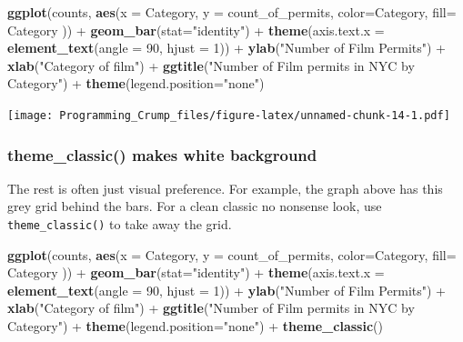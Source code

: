 \documentclass[]{book}
\newenvironment{Shaded}{\begin{snugshade}}{\end{snugshade}}
\newcommand{\KeywordTok}[1]{\textcolor[rgb]{0.13,0.29,0.53}{\textbf{{#1}}}}
\newcommand{\DataTypeTok}[1]{\textcolor[rgb]{0.13,0.29,0.53}{{#1}}}
\newcommand{\DecValTok}[1]{\textcolor[rgb]{0.00,0.00,0.81}{{#1}}}
\newcommand{\StringTok}[1]{\textcolor[rgb]{0.31,0.60,0.02}{{#1}}}
\newcommand{\NormalTok}[1]{{#1}}
\theoremstyle{definition}
\theoremstyle{definition}
\theoremstyle{definition}
\theoremstyle{remark}
\begin{document}
\begin{Shaded}
\begin{Highlighting}[]
\KeywordTok{ggplot}\NormalTok{(counts, }\KeywordTok{aes}\NormalTok{(}\DataTypeTok{x =} \NormalTok{Category, }\DataTypeTok{y =} \NormalTok{count_of_permits, }
                   \DataTypeTok{color=}\NormalTok{Category, }
                   \DataTypeTok{fill=} \NormalTok{Category )) +}
\StringTok{  }\KeywordTok{geom_bar}\NormalTok{(}\DataTypeTok{stat=}\StringTok{"identity"}\NormalTok{) +}\StringTok{ }
\StringTok{  }\KeywordTok{theme}\NormalTok{(}\DataTypeTok{axis.text.x =} \KeywordTok{element_text}\NormalTok{(}\DataTypeTok{angle =} \DecValTok{90}\NormalTok{, }\DataTypeTok{hjust =} \DecValTok{1}\NormalTok{)) +}
\StringTok{  }\KeywordTok{ylab}\NormalTok{(}\StringTok{"Number of Film Permits"}\NormalTok{) +}\StringTok{ }
\StringTok{  }\KeywordTok{xlab}\NormalTok{(}\StringTok{"Category of film"}\NormalTok{) +}
\StringTok{  }\KeywordTok{ggtitle}\NormalTok{(}\StringTok{"Number of Film permits in NYC by Category"}\NormalTok{) +}
\StringTok{  }\KeywordTok{theme}\NormalTok{(}\DataTypeTok{legend.position=}\StringTok{"none"}\NormalTok{)}
\end{Highlighting}
\end{Shaded}

\texttt{[image: Programming\_Crump\_files/figure-latex/unnamed-chunk-14-1.pdf]}

\subsubsection{theme\_classic() makes white
background}\label{theme_classic-makes-white-background}

The rest is often just visual preference. For example, the graph above
has this grey grid behind the bars. For a clean classic no nonsense
look, use \texttt{theme\_classic()} to take away the grid.

\begin{Shaded}
\begin{Highlighting}[]
\KeywordTok{ggplot}\NormalTok{(counts, }\KeywordTok{aes}\NormalTok{(}\DataTypeTok{x =} \NormalTok{Category, }\DataTypeTok{y =} \NormalTok{count_of_permits, }
                   \DataTypeTok{color=}\NormalTok{Category, }
                   \DataTypeTok{fill=} \NormalTok{Category )) +}
\StringTok{  }\KeywordTok{geom_bar}\NormalTok{(}\DataTypeTok{stat=}\StringTok{"identity"}\NormalTok{) +}\StringTok{ }
\StringTok{  }\KeywordTok{theme}\NormalTok{(}\DataTypeTok{axis.text.x =} \KeywordTok{element_text}\NormalTok{(}\DataTypeTok{angle =} \DecValTok{90}\NormalTok{, }\DataTypeTok{hjust =} \DecValTok{1}\NormalTok{)) +}
\StringTok{  }\KeywordTok{ylab}\NormalTok{(}\StringTok{"Number of Film Permits"}\NormalTok{) +}\StringTok{ }
\StringTok{  }\KeywordTok{xlab}\NormalTok{(}\StringTok{"Category of film"}\NormalTok{) +}
\StringTok{  }\KeywordTok{ggtitle}\NormalTok{(}\StringTok{"Number of Film permits in NYC by Category"}\NormalTok{) +}
\StringTok{  }\KeywordTok{theme}\NormalTok{(}\DataTypeTok{legend.position=}\StringTok{"none"}\NormalTok{) +}
\StringTok{  }\KeywordTok{theme_classic}\NormalTok{()}
\end{Highlighting}
\end{Shaded}
\end{document}
